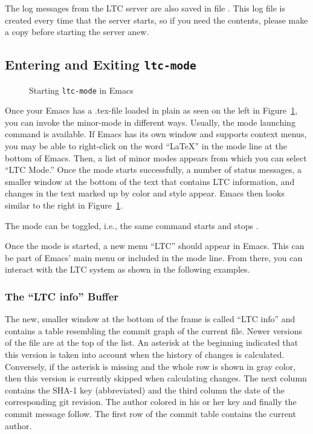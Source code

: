 The log messages from the LTC server are also saved in file .  This log file is created every time that the server starts, so if you need the contents, please make a copy before starting the server anew.

\subsection{Entering and Exiting \texttt{ltc-mode}}

\begin{figure}[t]
\centering
{}
\hspace{2ex}
\hspace{2ex}
\caption{Starting \texttt{ltc-mode} in Emacs} \label{fig:emacs-ltc-started}
\end{figure}

Once your Emacs has a .tex-file loaded in plain  as seen on the left in Figure~\ref{fig:emacs-ltc-started}, you can invoke the minor-mode  in different ways.  Usually, the mode launching command  is available.  If Emacs has its own window and supports context menus, you may be able to right-click on the word ``LaTeX'' in the mode line at the bottom of Emacs. Then, a list of minor modes appears from which you can select ``LTC Mode.''  Once the mode starts successfully, a number of status messages, a smaller window at the bottom of the text that contains LTC information, and changes in the text marked up by color and style appear.  Emacs then looks similar to the right in Figure~\ref{fig:emacs-ltc-started}.

The mode can be toggled, i.e., the same command starts and stops .

Once the mode is started, a new menu ``LTC'' should appear in Emacs.  This can be part of Emacs' main menu or included in the mode line.  From there, you can interact with the LTC system as shown in the following examples.

\subsubsection{The ``LTC info'' Buffer}

The new, smaller window at the bottom of the frame is called ``LTC info'' and contains a table resembling the commit graph of the current file.  Newer versions of the file are at the top of the list.  An asterisk at the beginning  indicated that this version is taken into account when the history of changes is calculated.  Conversely, if the asterisk is missing and the whole row is shown in gray color, then this version is currently skipped when calculating changes.  The next column contains the SHA-1 key (abbreviated) and the third column the date  of the corresponding git revision.  The author colored in his or her key and finally the commit message follow.  The first row of the commit table contains the current author.

